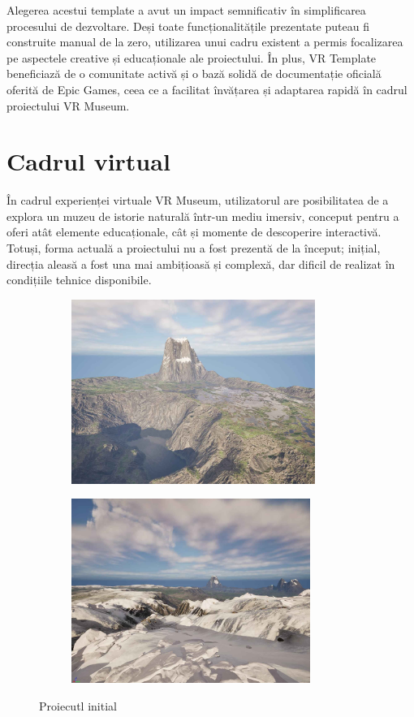 Alegerea acestui template a avut un impact semnificativ în simplificarea procesului de dezvoltare. Deși toate funcționalitățile prezentate puteau fi construite manual de la zero, utilizarea unui cadru existent a permis focalizarea pe aspectele creative și educaționale ale proiectului. În plus, VR Template beneficiază de o comunitate activă și o bază solidă de documentație oficială oferită de Epic Games, ceea ce a facilitat învățarea și adaptarea rapidă în cadrul proiectului VR Museum.

\section{Cadrul virtual}

În cadrul experienței virtuale VR Museum, utilizatorul are posibilitatea de a explora un muzeu de istorie naturală într-un mediu imersiv, conceput pentru a oferi atât elemente educaționale, cât și momente de descoperire interactivă. Totuși, forma actuală a proiectului nu a fost prezentă de la început; inițial, direcția aleasă a fost una mai ambițioasă și complexă, dar dificil de realizat în condițiile tehnice disponibile.

\begin{figure}[h!]
    \centering
    \begin{subfigure}{0.49\textwidth}
        \includegraphics[width=\linewidth, height=6cm]{continut/capitol3/figuri/attempt.jpg}
        \label{fig:First VR attempt}
    \end{subfigure}
    \hfill
    \begin{subfigure}{0.49\textwidth}
        \includegraphics[width=\linewidth, height=6cm]{continut/capitol3/figuri/attempt1jpg.jpg}
        \label{fig:First VR attempt}
    \end{subfigure}

    \caption{Proiecutl initial}
\end{figure}

